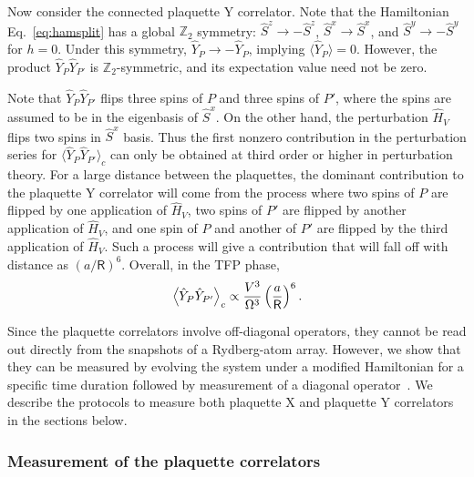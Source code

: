 \documentclass[twocolumn,superscriptaddress,amsmath,amssymb,aps,prx,nofootinbib]{revtex4-2}
\begin{document}
Now consider the connected plaquette Y correlator. 
Note that the Hamiltonian Eq.~\eqref{eq:hamsplit} has a global $\mathbb{Z}_2$ symmetry: $\hat{S}^z \rightarrow -\hat{S}^z$, $\hat{S}^x \rightarrow \hat{S}^x$, and $\hat{S}^y \rightarrow -\hat{S}^y$ for $h=0$. Under this symmetry, $\hat{Y}_P \rightarrow -\hat{Y}_P$, implying  $\langle \hat{Y}_P \rangle = 0$. 
However, the product $\hat{Y}_P \hat{Y}_{P'}$ is $\mathbb{Z}_2$-symmetric, and its expectation value need not be zero. 

Note that $\hat{Y}_P \hat{Y}_{P'}$ flips three spins of $P$ and three spins of $P'$, where the spins are assumed to be in the eigenbasis of  $\hat{S}^x$. On the other hand, the perturbation $\hat{H}_V$ flips two spins in $\hat{S}^x$ basis. Thus the first nonzero contribution in the perturbation series for $\langle \hat{Y}_P \hat{Y}_{P'} \rangle_c$ can only be obtained at third order or higher in perturbation theory. For a large distance between the plaquettes, the dominant contribution to the plaquette Y correlator will come from the process where two spins of $P$ are flipped by one application of $\hat{H}_V$, two spins of $P'$ are flipped by another application of $\hat{H}_V$, and one spin of $P$ and another of $P'$ are flipped by the third application of $\hat{H}_V$. Such a process will give a contribution that will fall off with distance as $\left(a / \mathsf{R} \right)^6$. Overall, in the TFP phase,
\begin{equation}
    \label{eq:Y_plaq_corr_TFP}
        \expval{ \hat{Y}_P \hat{Y}_{P'} }_{c} \propto \frac{V^3}{\Omega^3 } \left( \frac{a}{\mathsf{R}} \right)^{6}.
\end{equation}

Since the plaquette correlators involve off-diagonal operators, they cannot be read out directly from the snapshots of a Rydberg-atom array. However, we show  that they can be measured by evolving the system under a modified Hamiltonian for a specific time duration followed by measurement of a diagonal operator~\cite{verresen2021, semeghini2021}. We describe the protocols to measure both plaquette X and plaquette Y correlators in the sections below.


\subsubsection{Measurement of the plaquette correlators} \label{sec:xy_plaq_corr}
\end{document}
